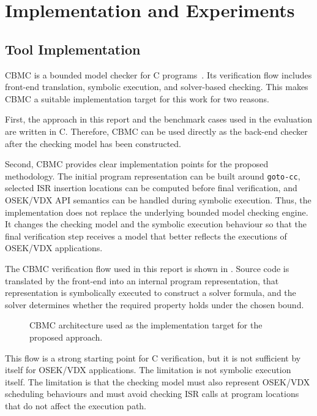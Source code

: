 \section{Implementation and Experiments}
\label{sec:experiment}

\subsection{Tool Implementation}

CBMC is a bounded model checker for C programs~\cite{clarke_biere_raimi_zhu_bounded_model_checking_2001,cbmc_2004,cbmc_architecture}.
Its verification flow includes front-end translation, symbolic execution, and solver-based
checking. This makes CBMC a suitable implementation target for this work for two reasons.

First, the approach in this report and the benchmark cases used in the evaluation are written in C. Therefore, CBMC can be used directly as the back-end checker after the checking model has been constructed.

Second, CBMC provides clear implementation points for the proposed methodology. The initial
program representation can be built around \texttt{goto-cc}, selected ISR insertion locations
can be computed before final verification, and OSEK/VDX API semantics can be handled during
symbolic execution. Thus, the implementation does not replace the underlying bounded model
checking engine. It changes the checking model and the symbolic execution behaviour so that
the final verification step receives a model that better reflects the executions of OSEK/VDX
applications.

The CBMC verification flow used in this report is shown in . Source code is translated by the front-end into an internal program representation, that representation is symbolically executed to construct a solver formula, and the solver determines whether the required property holds under the chosen bound.

\begin{figure}[H]
  \centering
  
  \caption{CBMC architecture used as the implementation target for the proposed approach.}
  \label{fig:baseline-cbmc}
\end{figure}

This flow is a strong starting point for C verification, but it is not sufficient by itself for OSEK/VDX applications. The limitation is not symbolic execution itself. The limitation is that the checking model must also represent OSEK/VDX scheduling behaviours and must avoid checking ISR calls at program locations that do not affect the execution path.


